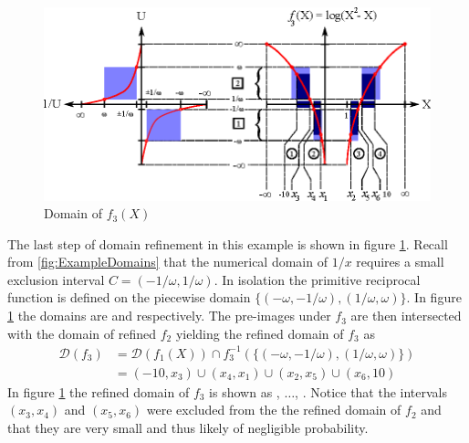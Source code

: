 \begin{figure}
  \centering
  \includegraphics{Images/logX2minusX.eps}
  \caption[Domain of $f_3(X)$]
          {Domain of $f_3(X)$}
  \label{fig:logX2minusX}
\end{figure}

The last step of domain refinement in this example is shown in figure \ref{fig:logX2minusX}. Recall from \ref{fig:ExampleDomains} that the numerical domain of $1/x$ requires a small exclusion interval $C = (-1/\omega, 1/\omega)$. In isolation the primitive reciprocal function is defined on the piecewise domain $\{(-\omega, -1/\omega), (1/\omega, \omega)\}$. In figure \ref{fig:logX2minusX} the domains are  and  respectively. The pre-images under $f_3$ are then intersected with the domain of refined $f_2$ yielding the refined domain of $f_3$ as
\begin{align*}
\mathcal{D}(f_3) &= \mathcal{D}(f_1(X)) \cap f_3^{-1}(\{(-\omega, -1/\omega), (1/\omega, \omega)\}) \\
                    &= (-10, x_3) \cup (x_4, x_1) \cup (x_2, x_5) \cup (x_6, 10)
\end{align*}
In figure \ref{fig:logX2minusX} the refined domain of $f_3$ is shown as , $\dots$, . Notice that the intervals $(x_3,x_4)$ and $(x_5, x_6)$ were excluded from the the refined domain of $f_2$ and that they are very small and thus likely of negligible probability.



